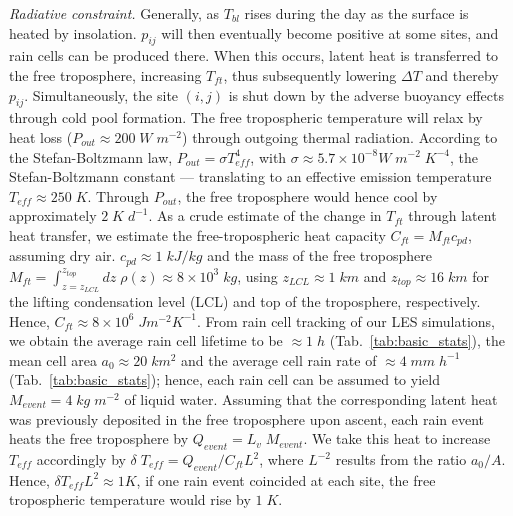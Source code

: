\documentclass[draft,linenumbers]{agujournal2019}
\begin{document}
\noindent
{\it Radiative constraint.}
Generally, as $T_{bl}$ rises during the day as the surface is heated by insolation. 
$p_{ij}$ will then eventually become positive at some sites, and rain cells can be produced there.
When this occurs, latent heat is transferred to the free troposphere, increasing $T_{ft}$, thus subsequently lowering $\Delta T$ and thereby $p_{ij}$.
Simultaneously, the site $(i,j)$ is shut down by the adverse buoyancy effects through cold pool formation.
The free tropospheric temperature will relax by heat loss ($P_{out}\approx 200\;W\;m^{-2}$) through outgoing thermal radiation. 
According to the Stefan-Boltzmann law, $P_{out}=\sigma T_{eff}^4$, with $\sigma\approx 5.7\times 10^{-8}W\;m^{-2}\;K^{-4}$, the Stefan-Boltzmann constant --- translating to an effective emission temperature $T_{eff}\approx 250\;K$. 
Through $P_{out}$, the free troposphere would hence cool by approximately $2\;K\;d^{-1}$.
As a crude estimate of the change in $T_{ft}$ through latent heat transfer, we estimate the free-tropospheric heat capacity $C_{ft}=M_{ft}c_{pd}$, assuming dry air.
$c_{pd}\approx 1\;kJ/kg$ and the mass of the free troposphere $M_{ft}=\int_{z=z_{LCL}}^{z_{top}}dz\;\rho(z)\approx 8\times 10^3\;kg$, using $z_{LCL}\approx 1\;km$ and $z_{top}\approx 16\;km$ for the lifting condensation level (LCL) and top of the troposphere, respectively.
Hence, $C_{ft}\approx 8\times 10^6\;Jm^{-2}K^{-1}$.
From rain cell tracking of our LES simulations, we obtain the average rain cell lifetime to be $\approx 1\;h$ (Tab.~\ref{tab:basic_stats}), the mean cell area $a_0\approx 20\;km^2$ and the average cell rain rate of $\approx 4\;mm\;h^{-1}$ (Tab.~\ref{tab:basic_stats}); hence, each rain cell can be assumed to yield $M_{event}=4\;kg\;m^{-2}$ of liquid water.
Assuming that the corresponding latent heat was previously deposited in the free troposphere upon ascent, each rain event heats the free troposphere by $Q_{event}=L_v\;M_{event}$.
We take this heat to increase $T_{eff}$ accordingly by $\delta\;T_{eff}=Q_{event}/C_{ft}L^{2}$, where $L^{-2}$ results from the ratio $a_0/A$.
Hence, $\delta T_{eff}L^2\approx 1K$, if one rain event coincided at each site, the free tropospheric temperature would rise by $1\;K$.

\end{document}
